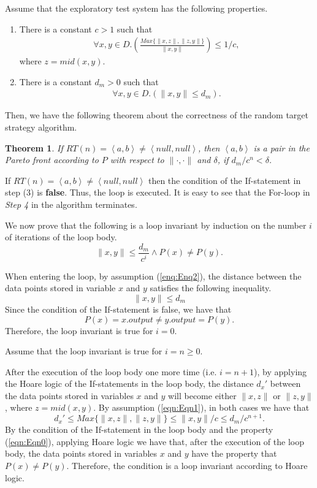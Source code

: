 \documentclass[preprint,1p,authoryear,times]{elsarticle}
\newtheorem{Theorem} {Theorem}
\begin{document}
Assume that the exploratory test system has the following properties.
\begin{enumerate}
\item There is a constant $c>1$ such that  
\begin{eqnarray}
\forall x,y \in D.\left(\frac{Max\{\|x,z\|,\|z,y\|\}}{\|x,y\|}\right) \leq 1/c, \label{eqn:Eqn1}
\end{eqnarray} 
where $z=mid(x,y)$. 
\item There is a constant $d_m>0$ such that
\begin{eqnarray}
\forall x,y \in D.(\|x,y\| \leq d_m). \label{enq:Enq2}
\end{eqnarray}
\end{enumerate}

Then, we have the following theorem about the correctness of the random target strategy algorithm. 

\begin{Theorem}\label{thm:Thm1}
If $RT(n)=\left< a, b \right> \neq \left< null, null \right>$, then $\left< a ,b \right>$ is a pair in the Pareto front according to $P$ with respect to $\|\cdot,\cdot\|$ and  $\delta$, if $d_m/c^n < \delta$. 
\end{Theorem}
If $RT(n)=\left<a, b \right> \neq \left< null, null \right>$ then the condition of the If-statement in step (3) is \textbf{false}. Thus, the loop is executed. It is easy to see that the For-loop in \emph{Step 4} in the algorithm terminates. 

We now prove that the following is a loop invariant by induction on the number $i$ of iterations of the loop body. 
\[\|x,y\| \leq \frac{d_m}{c^i} \wedge P(x) \neq P(y).\] 

When entering the loop, by assumption (\ref{enq:Enq2}), the distance between the data points stored in variable $x$ and $y$ satisfies the following inequality.
\[\|x,y\| \leq d_m\]
Since the condition of the If-statement is false, we have that 
\[P(x)=x.output \neq y.output=P(y).\] 
Therefore, the loop invariant is true for $i=0$. 

Assume that the loop invariant is true for $i=n \geq 0$. 

After the execution of the loop body one more time (i.e. $i=n+1$), by applying the Hoare logic of the If-statements in the loop body, the distance $d_x'$ between the data points stored in variables $x$ and $y$ will become either $\|x,z\|$ or $\|z,y\|$, where $z=mid(x,y)$. By assumption (\ref{eqn:Eqn1}), in both cases we have that 
\[d_x' \leq Max\{\|x,z\|,\|z,y\|\} \leq {\|x,y\|}/c \leq d_m /c^{n+1}.\]
By the condition of the If-statement in the loop body and the property (\ref{eqn:Eqn0}), applying Hoare logic we have that, after the execution of the loop body, the data points stored in variables $x$ and $y$ have the property that $P(x) \neq P(y)$.
Therefore, the condition is a loop invariant according to Hoare logic. 
\end{document}
